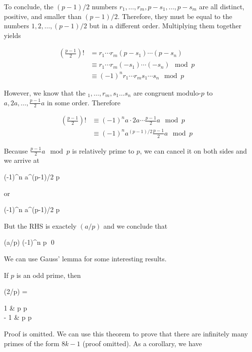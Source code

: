 To conclude, the $(p-1)/2$ numbers $r_1, \ldots, r_m, p - s_1, \ldots, p - s_m$ are all distinct, positive, and smaller than $(p-1)/2$. Therefore, they must be equal to the numbers $1, 2, \ldots, (p-1)/2$ but in a different order. Multiplying them together yields

\begin{align*}
\left( \frac{p-1}{2} \right) ! &= r_1 \cdots r_m (p-s_1)\cdots (p-s_n) \\
&\equiv r_1 \cdots r_m (-s_1)\cdots (-s_n) \mod p \\
&\equiv(-1)^n r_1 \cdots r_m s_1\cdots s_n \mod p
\end{align*}

However, we know that the $_1, \ldots, r_m, s_1\ldots s_n$ are congruent modulo-$p$ to $a, 2a, \ldots, \frac{p-1}{2}a$  in some order. Therefore 

\begin{align*}
\left( \frac{p-1}{2} \right) ! &\equiv (-1)^n a \cdot 2a \cdots \frac{p-1}{2}a \mod p \\
&\equiv (-1)^n a^{(p-1)/2} \frac{p-1}{2}a \mod p
\end{align*}

Because $\frac{p-1}{2}a \mod p$ is relatively prime to $p$, we can cancel it on both sides and we arrive at

 \equiv (-1)^n a^{(p-1)/2}  \mod p \\
\eee

or

\bee
(-1)^n  \equiv a^{(p-1)/2}  \mod p \\
\eee

But the RHS is exactely $(a/p)$ and we conclude that

\bee
(a/p) \equiv (-1)^n \mod p \qed
\eee

We can use Gauss' lemma for some interesting results.

\begin{theorem}
	If $p$ is an odd prime, then

	\bee
		(2/p) = \begin{cases}
			1 &  p    p   \\
			- 1 &  p    p  
		\end{cases}
	\eee
\end{theorem}

Proof is omitted. We can use this theorem to prove that there are infinitely many primes of the form $8k-1$ (proof omitted). As a corollary, we have

